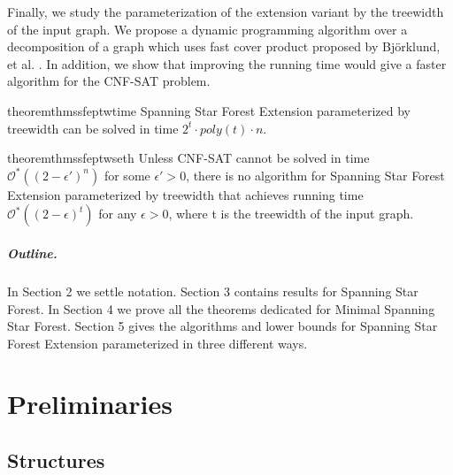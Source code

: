 \documentclass[en]{pracamgr}
\theoremstyle{definition}
\newcommand{\ssfp}{{\sc Spanning Star Forest}}
\newcommand{\mssfp}{{\sc Minimal Spanning Star Forest}}
\newcommand{\ssfep}{{\sc Spanning Star Forest Extension}}
\newcommand{\cnfsat}{{\sc CNF-SAT}}
\begin{document}
Finally, we study the parameterization of the extension variant by the treewidth of the input graph. We propose a dynamic programming algorithm over a decomposition of a graph which uses fast cover product proposed by Björklund, et al. \cite{Cover product}. In addition, we show that improving the running time would give a faster algorithm for the \cnfsat{} problem.

\begin{restatable}{theorem}{thmssfeptwtime}\label{thm-ssfep-tw-time}
	\ssfep{} parameterized by treewidth can be solved in time $2^t\cdot poly(t)\cdot n$.
\end{restatable}

\begin{restatable}{theorem}{thmssfeptwseth}\label{thm-ssfep-tw-seth}
	Unless \cnfsat{} cannot be solved in time $\mathcal{O}^*((2-\epsilon')^n)$ for some $\epsilon' > 0$, there is no algorithm for \ssfep{} parameterized by treewidth that achieves running time $\mathcal{O}^*((2-\epsilon)^{t})$ for any $\epsilon > 0$, where \textup{\textrm{t}} is the treewidth of the input graph.
\end{restatable}

\paragraph{Outline.} In Section 2 we settle notation. Section 3 contains results for \ssfp{}. In Section 4 we prove all the theorems dedicated for \mssfp{}. Section 5 gives the algorithms and lower bounds for \ssfep{} parameterized in three different ways.

\chapter{Preliminaries}\label{sec2}

\section{Structures}
\end{document}

